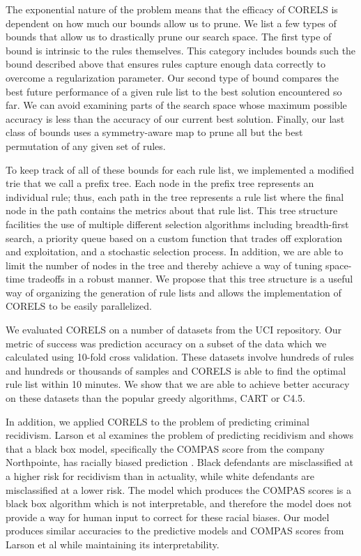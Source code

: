 The exponential nature of the problem means that the efficacy of CORELS is dependent on how much our bounds allow us to prune. 
We list a few types of bounds that allow us to drastically prune our search space. 
The first type of bound is intrinsic to the rules themselves. 
This category includes bounds such the bound described above that ensures rules capture enough data correctly to overcome a regularization parameter. 
Our second type of bound compares the best future performance of a given rule list to the best solution encountered so far. 
We can avoid examining parts of the search space whose maximum possible accuracy is less than the accuracy of our current best solution. 
Finally, our last class of bounds uses a symmetry-aware map to prune all but the best permutation of any given set of rules.

To keep track of all of these bounds for each rule list, we implemented a modified trie that we call a prefix tree. 
Each node in the prefix tree represents an individual rule; thus, each path in the tree represents a rule list where the final node in the path contains the metrics about that rule list.
This tree structure facilities the use of multiple different selection algorithms including breadth-first search, a priority queue based on a custom function that trades off exploration and exploitation, and a stochastic selection process. 
In addition, we are able to limit the number of nodes in the tree and thereby achieve a way of tuning space-time tradeoffs in a robust manner. 
We propose that this tree structure is a useful way of organizing the generation of rule lists and allows the implementation of CORELS to be easily parallelized.

We evaluated CORELS on a number of datasets from the UCI repository. 
Our metric of success was prediction accuracy on a subset of the data which we calculated using 10-fold cross validation. 
These datasets involve hundreds of rules and hundreds or thousands of samples and CORELS is able to find the optimal rule list within 10 minutes. 
We show that we are able to achieve better accuracy on these datasets than the popular greedy algorithms, CART or C4.5.

In addition, we applied CORELS to the problem of predicting criminal recidivism. 
Larson et al examines the problem of predicting recidivism and shows that a black box model, specifically the COMPAS score from the company Northpointe, has racially biased prediction \cite{LarsonMaKiAn16}.
Black defendants are misclassified at a higher risk for recidivism than in actuality, while white defendants are misclassified at a lower risk. 
The model which produces the COMPAS scores is a black box algorithm which is not interpretable, and therefore the model does not provide a way for human input to correct for these racial biases. 
Our model produces similar accuracies to the predictive models and COMPAS scores from Larson et al while maintaining its interpretability.

